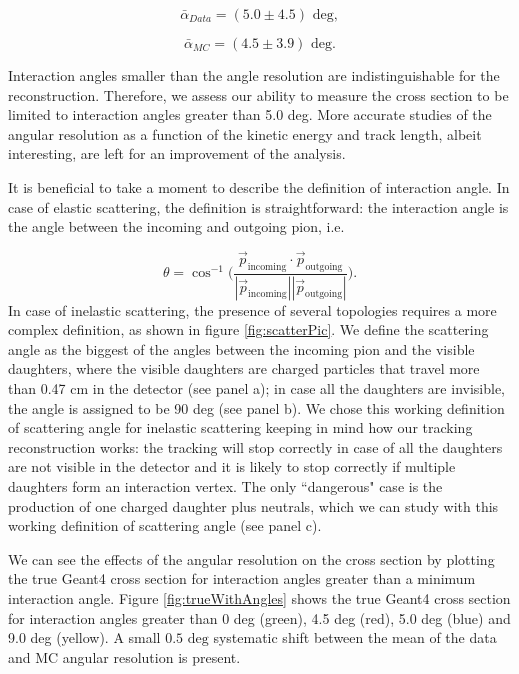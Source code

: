 \begin{equation}
\bar\alpha_{Data} = (5.0 \pm 4.5) \text{ deg}, 
\end{equation}

\begin{equation}
\bar\alpha_{MC} = (4.5 \pm 3.9) \text{ deg}. 
\end{equation}

Interaction angles smaller than the angle resolution are indistinguishable for the reconstruction. Therefore, we assess our ability to measure the cross section to be limited to interaction angles greater than 5.0 deg. More accurate studies of the angular resolution as a function of the kinetic energy and track length, albeit interesting, are left for an improvement of the analysis. 

It is beneficial to take a moment to describe the definition of interaction angle. In case of elastic scattering, the definition is straightforward: the interaction angle is the angle between the incoming and outgoing pion, i.e.

\begin{equation}  
\theta = \cos^{-1} \Big(\frac{\vec p _{\text{incoming}}  \cdot\vec p _{\text{outgoing}}}{|\vec p _{\text{incoming}}|  |\vec p _{\text{outgoing}}| }\Big).
\end{equation}   
In case of inelastic scattering,  the presence of several topologies requires a more complex definition, as shown in figure \ref{fig:scatterPic}.  We define the scattering angle as the biggest of the angles between the incoming pion and the visible daughters, where the visible daughters are charged particles that travel more than 0.47 cm in the detector (see panel a); in case all the daughters are invisible, the angle is assigned to be 90 deg (see panel b). We chose this working definition of scattering angle for inelastic scattering keeping in mind how our tracking reconstruction works: the tracking will stop correctly in case of all the daughters are not visible in the detector and it is likely to stop correctly if multiple daughters form an interaction vertex. The only ``dangerous" case is the production of one charged daughter plus neutrals, which we can study with this working definition of scattering angle (see panel c).


We can see the effects of the angular resolution on the cross section by plotting the true Geant4 cross section for interaction angles greater than a minimum interaction angle. Figure \ref{fig:trueWithAngles} shows the  true Geant4 cross section  for interaction angles greater than 0 deg (green), 4.5 deg (red), 5.0 deg  (blue) and 9.0 deg (yellow). 
A small $0.5 \text{ deg}$ systematic shift between the mean of the data and MC angular resolution is present.%

